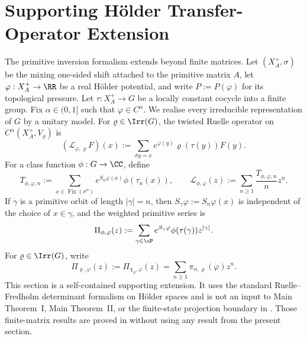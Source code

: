 \section{Supporting H\"older Transfer-Operator Extension}
\label{sec:holder-transfer}

The primitive inversion formalism extends beyond finite matrices. Let
\((X_A^+,\sigma)\) be the mixing one-sided shift attached to the
primitive matrix \(A\), let \(\varphi:X_A^+\to\RR\) be a real
H\"older potential, and write \(P:=P(\varphi)\) for its topological
pressure. Let \(\tau:X_A^+\to G\) be a locally constant cocycle into a
finite group. Fix \(\alpha\in(0,1]\) such that
\(\varphi\in C^\alpha\). We realise every irreducible representation
of \(G\) by a unitary model. For \(\varrho\in\Irr(G)\), the twisted
Ruelle operator on \(C^\alpha(X_A^+,V_\varrho)\) is
\[
  (\mathscr L_{\varphi,\varrho}F)(x)
  :=
  \sum_{\sigma y=x}e^{\varphi(y)}\varrho(\tau(y))F(y).
\]
For a class function \(\phi:G\to\CC\), define
\[
  T_{\phi,\varphi,n}
  :=
  \sum_{x\in\operatorname{Fix}(\sigma^n)}
    e^{S_n\varphi(x)}\phi(\tau_n(x)),
  \qquad
  \mathcal L_{\phi,\varphi}(z)
  :=
  \sum_{n\ge 1}\frac{T_{\phi,\varphi,n}}{n}z^n.
\]
If \(\gamma\) is a primitive orbit of length \(|\gamma|=n\), then
\(S_\gamma\varphi:=S_n\varphi(x)\) is independent of the choice of
\(x\in\gamma\), and the weighted primitive series is
\[
  \Pi_{\phi,\varphi}(z)
  :=
  \sum_{\gamma\in\cP}
    e^{S_\gamma\varphi}\phi(\tau(\gamma))z^{|\gamma|}.
\]
For \(\varrho\in\Irr(G)\), write
\[
  \Pi_{\varrho,\varphi}(z):=\Pi_{\chi_\varrho,\varphi}(z)
  =\sum_{n\ge 1}\pi_{n,\varrho}(\varphi)z^n.
\]
This section is a self-contained supporting extension. It uses the
standard Ruelle--Fredholm determinant formalism on H\"older spaces and
is not an input to Main Theorem~I, Main Theorem~II, or the finite-state
projection boundary in
. Those finite-matrix
results are proved in  without using
any result from the present section.

